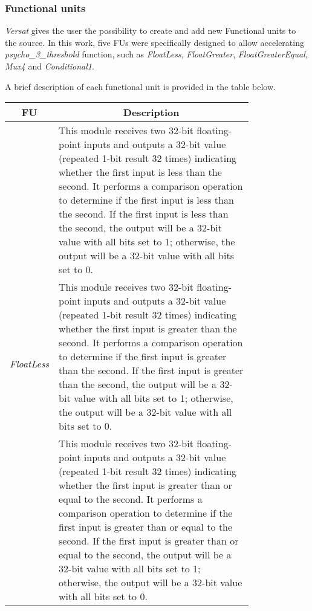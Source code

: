 \subsubsection{Functional units}
\textit{Versat} gives the user the possibility to create and add new Functional units to the source. In this work, five FUs were specifically designed to allow accelerating \textit{psycho\_3\_threshold} function, such as \textit{FloatLess}, \textit{FloatGreater}, \textit{FloatGreaterEqual}, \textit{Mux4} and \textit{Conditional1}.

A brief description of each functional unit is provided in the table below.

\vspace{0.5cm}

\begin{table}[H]
    \centering
    \begin{tabular}{|c|p{0.8\linewidth}|}
        \hline
        \multicolumn{1}{|c|}{\textbf{FU}} & \multicolumn{1}{c|}{\textbf{Description}} \\
        \hline
        \multirow{6}{*}{\textit{FloatLess}} & This module receives two 32-bit floating-point inputs and outputs a 32-bit value (repeated 1-bit result 32 times) indicating whether the first input is less than the second. It performs a comparison operation to determine if the first input is less than the second. If the first input is less than the second, the output will be a 32-bit value with all bits set to 1; otherwise, the output will be a 32-bit value with all bits set to 0.  \\
        \hline
        \multirow{6}{*}{\textit{FloatGreater}} & This module receives two 32-bit floating-point inputs and outputs a 32-bit value (repeated 1-bit result 32 times) indicating whether the first input is greater than the second. It performs a comparison operation to determine if the first input is greater than the second. If the first input is greater than the second, the output will be a 32-bit value with all bits set to 1; otherwise, the output will be a 32-bit value with all bits set to 0. \\
        \hline
        \multirow{6}{*}{\textit{FloatGreaterEqual}} & This module receives two 32-bit floating-point inputs and outputs a 32-bit value (repeated 1-bit result 32 times) indicating whether the first input is greater than or equal to the second. It performs a comparison operation to determine if the first input is greater than or equal to the second. If the first input is greater than or equal to the second, the output will be a 32-bit value with all bits set to 1; otherwise, the output will be a 32-bit value with all bits set to 0. \\

\end{tabular}
\end{table}
